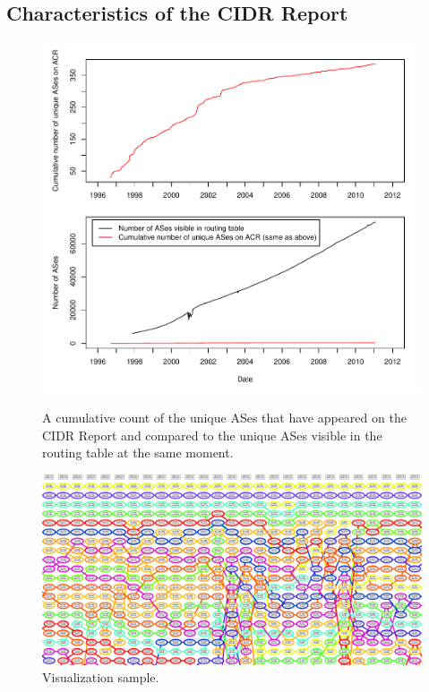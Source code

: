 \chapter{}
\label{chap:analysis}

\section{Characteristics of the CIDR Report}

\begin{figure}
\begin{centering}
    \includegraphics[width=6in]{figures/cumulative_asn_counts.pdf}
    \vspace{-2em}\\
    \caption{A cumulative count of the unique ASes that have appeared on the CIDR Report and compared to the unique ASes visible in the routing table at the same moment.}
\end{centering}
\end{figure}

\begin{figure}
\begin{centering}
    \includegraphics[width=6in]{figures/viz_sample.jpg}
    \caption{Visualization sample.}
\end{centering}
\end{figure}

